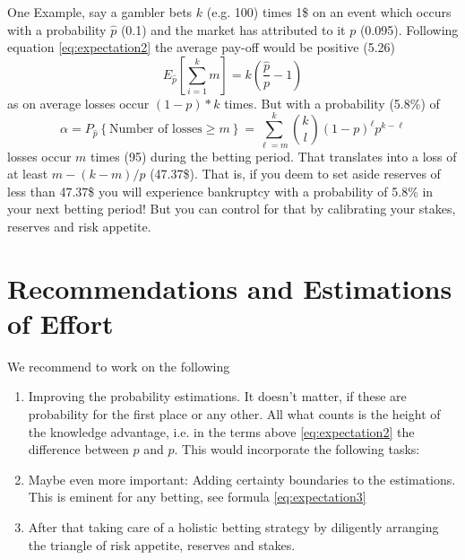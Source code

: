 \documentclass{article}
\begin{document}
One Example, say a gambler bets $k$ (e.g. 100) times 1\$ on an event which occurs with a probability $\hat p$ (0.1) and the market has attributed to it $p$ (0.095). Following equation \eqref{eq:expectation2} the average pay-off would be positive (5.26)
\begin{equation}
    E_{\hat p}\left[ \sum_{i=1}^k m \right] = k(\frac{\hat p}p -1)
\end{equation}
as on average losses occur $(1-p)*k$ times. But with a probability (5.8\%) of 
\begin{equation}
    \alpha = P_{\hat p}\left\{ \text{Number of losses} \geq m \right\} = \sum_{\ell=m}^k \binom{k}{l}(1-p)^\ell p^{k-\ell}
\end{equation}
losses occur $m$ times (95) during the betting period. That translates into a loss of at least $m-(k-m)/p$ (47.37\$). That is, if you deem to set aside reserves of less than 47.37\$ you will experience bankruptcy with a probability of 5.8\% in your next betting period! But you can control for that by calibrating your stakes, reserves and risk appetite.

\section{Recommendations and Estimations of Effort}
We recommend to work on the following
\begin{enumerate}
    \item Improving the probability estimations. It doesn't matter, if these are probability for the first place or any other. All what counts is the height of the knowledge advantage, i.e. in the terms above \eqref{eq:expectation2} the difference between $\hat p$ and $p$. This would incorporate the following tasks:
    \item Maybe even more important: Adding certainty boundaries to the estimations. This is eminent for any betting, see formula \eqref{eq:expectation3}
    \item After that taking care of a holistic betting strategy by diligently arranging the triangle of risk appetite, reserves and stakes.
\end{enumerate}
\end{document}
